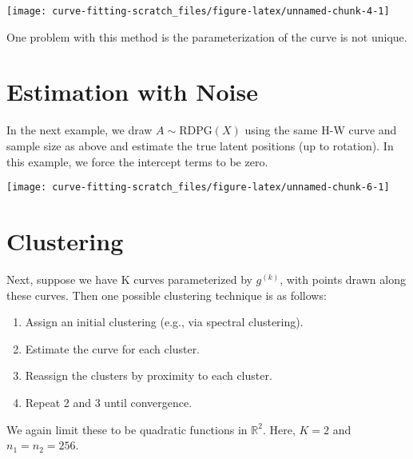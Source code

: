 \documentclass[
  11pt,
]{article}
\providecommand{\tightlist}{%
  \setlength{\itemsep}{0pt}\setlength{\parskip}{0pt}}
\begin{document}
\begin{center}\texttt{[image: curve-fitting-scratch\_files/figure-latex/unnamed-chunk-4-1]} \end{center}

One problem with this method is the parameterization of the curve is not
unique.

\hypertarget{estimation-with-noise}{%
\section{Estimation with Noise}\label{estimation-with-noise}}

\begin{example}

In the next example, we draw $A \sim \mathrm{RDPG}(X)$ using the same H-W curve and sample size as above and estimate the true latent positions (up to rotation). 
In this example, we force the intercept terms to be zero.

\end{example}

\begin{center}\texttt{[image: curve-fitting-scratch\_files/figure-latex/unnamed-chunk-6-1]} \end{center}

\hypertarget{clustering}{%
\section{Clustering}\label{clustering}}

Next, suppose we have K curves parameterized by \(g^{(k)}\), with points
drawn along these curves. Then one possible clustering technique is as
follows:

\begin{enumerate}
\def\labelenumi{\arabic{enumi}.}
\tightlist
\item
  Assign an initial clustering (e.g., via spectral clustering).
\item
  Estimate the curve for each cluster.
\item
  Reassign the clusters by proximity to each cluster.
\item
  Repeat 2 and 3 until convergence.
\end{enumerate}

\begin{example}

We again limit these to be quadratic functions in $\mathbb{R}^2$. 
Here, $K = 2$ and $n_1 = n_2 = 256$.

\end{example}
\end{document}
